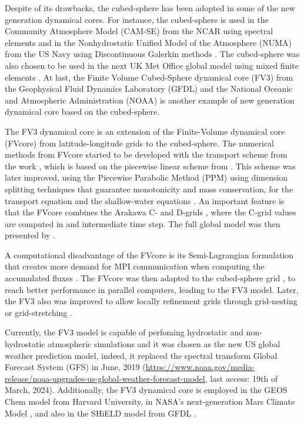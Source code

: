 Despite of its drawbacks, the cubed-sphere has been adopted in some of the new generation
dynamical cores.
For instance, the cubed-sphere is used in the 
Community Atmosphere Model (CAM-SE) from the NCAR using spectral elements \citep{dennis:2012} and in the
Nonhydrostatic Unified Model of the Atmosphere (NUMA) from the US Navy using Discontinuous Galerkin 
methods \citep{giraldo:2013}. The cubed-sphere was also chosen to be used in the next UK Met Office
global model using mixed finite elements \citep{melvin:2022}.
At last, the Finite­ Volume Cubed-Sphere dynamical core (FV3) from the Geophysical Fluid 
Dynamics Laboratory (GFDL) and the National Oceanic and Atmospheric Administration (NOAA)
\citep{putman:2007,harris:2013} is another example
of new generation dynamical core based on the cubed-sphere.

The FV3 dynamical core is an extension of the Finite-Volume dynamical core (FVcore)
from latitude-longitude grids to the cubed-sphere.
The numerical methods from FVcore started to be developed with the transport scheme from the work \citet{lin:1994},
which is based on the piecewise linear scheme from \citet{vanleer:1977}. 
This scheme was later improved, using the Piecewise Parabolic Method (PPM) \citep{colella:1984, carpenter:1990}
using dimension splitting techniques that guarantee monotonicity and mass conservation,
for the transport equation \citep{lin:1996} and the shallow-water equations \citep{lin:1997}. 
An important feature is that the FVcore combines the  Arakawa C- and D-grids \citep{arakawa:1977},
where the C-grid values are computed in and intermediate time step. 
The full global model was then presented by \citet{lin:2004}.

A computational disadvantage of the FVcore is its Semi-Lagrangian formulation that creates more demand
for MPI communication when computing the accumulated fluxes \citep{lin:1996}.
The FVcore was then adapted to the cubed-sphere grid \citep{putmanthesis:2007, putman:2007}, 
to reach better performance in parallel computers, leading to the FV3 model.
Later, the FV3 also was improved to allow locally refinement grids 
through grid-nesting or grid-stretching \citep{harris:2013}.

Currently, the FV3 model is capable of perfoming hydrostatic and non-hydrostatic atmospheric simulations 
and it was chosen as the new US global weather prediction model, indeed, it replaced the spectral transform
Global Forecast System (GFS) in June, 2019
(\url{https://www.noaa.gov/media-release/noaa-upgrades-us-global-weather-forecast-model}, last access: 19th of March, 2024).
Additionally, the FV3 dynamical core is employed in the GEOS Chem model \citep{martin:2022} from Harvard University, 
in NASA’s next-generation Mars Climate Model \citep{wilson:2022}, and also in the SHiELD model from GFDL \citep{harris:2020}.

